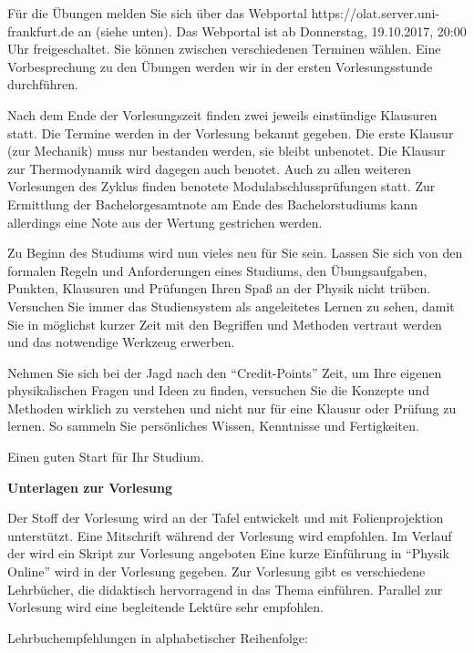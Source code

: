 Für die Übungen melden Sie sich über das Webportal https://olat.server.uni-frankfurt.de an (siehe unten). Das Webportal ist
ab Donnerstag, 19.10.2017, 20:00 Uhr freigeschaltet.
Sie können zwischen verschiedenen Terminen wählen.
Eine Vorbesprechung zu den Übungen werden wir in der ersten Vorlesungsstunde durchführen.

Nach dem Ende der Vorlesungszeit finden zwei jeweils einstündige Klausuren statt. 
Die Termine werden in der Vorlesung bekannt gegeben.
Die erste Klausur (zur Mechanik) muss nur bestanden werden, sie bleibt unbenotet. 
Die Klausur zur Thermodynamik wird dagegen auch benotet.
Auch zu allen weiteren Vorlesungen des Zyklus finden benotete Modulabschlussprüfungen statt.
Zur Ermittlung der Bachelorgesamtnote am Ende des Bachelorstudiums kann allerdings eine Note aus der Wertung gestrichen werden.

Zu Beginn des Studiums wird nun vieles neu für Sie sein.
Lassen Sie sich von den formalen Regeln und Anforderungen eines Studiums, den Übungsaufgaben, Punkten, Klausuren und Prüfungen Ihren Spaß an der Physik nicht trüben.
Versuchen Sie immer das Studiensystem als angeleitetes Lernen zu sehen, damit Sie in möglichst kurzer Zeit mit den Begriffen und Methoden vertraut werden und das notwendige Werkzeug erwerben.

Nehmen Sie sich bei der Jagd nach den "`Credit-Points"' Zeit, um Ihre eigenen physikalischen Fragen und Ideen zu finden, versuchen Sie die Konzepte und Methoden wirklich zu verstehen und nicht nur für eine Klausur oder Prüfung zu lernen.
So sammeln Sie persönliches Wissen, Kenntnisse und Fertigkeiten. 

Einen guten Start für Ihr Studium.
\smallskip

\noindent
\textbf{Unterlagen zur Vorlesung}

\medskip
Der Stoff der Vorlesung wird an der Tafel entwickelt und mit Folienprojektion unterstützt.
Eine Mitschrift während der Vorlesung wird empfohlen.
Im Verlauf der  wird ein Skript zur Vorlesung angeboten
Eine kurze Einführung in "`Physik Online"'  wird in der Vorlesung gegeben.
Zur Vorlesung gibt es verschiedene Lehrbücher, die didaktisch hervorragend in das Thema einführen.
Parallel zur Vorlesung wird eine begleitende Lektüre sehr empfohlen.

Lehrbuchempfehlungen in alphabetischer Reihenfolge:

